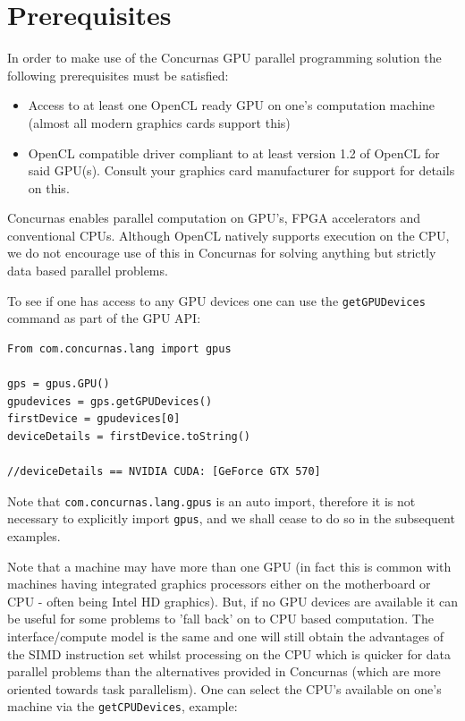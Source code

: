 \documentclass[conc-doc]{subfiles}
\begin{document}
\section{Prerequisites}
In order to make use of the Concurnas GPU parallel programming solution the following prerequisites must be satisfied:

\begin{itemize}
	\item Access to at least one OpenCL ready GPU on one's computation machine (almost all modern graphics cards support this)
	\item OpenCL compatible driver compliant to at least version 1.2 of OpenCL for said GPU(s). Consult your graphics card manufacturer for support for details on this.
\end{itemize}


Concurnas enables parallel computation on GPU's, FPGA accelerators and conventional CPUs. Although OpenCL natively supports execution on the CPU, we do not encourage use of this in Concurnas for solving anything but strictly data based parallel problems.

To see if one has access to any GPU devices one can use the \lstinline{getGPUDevices} command as part of the GPU API:

\begin{lstlisting}
From com.concurnas.lang import gpus

gps = gpus.GPU()
gpudevices = gps.getGPUDevices()
firstDevice = gpudevices[0]
deviceDetails = firstDevice.toString()

//deviceDetails == NVIDIA CUDA: [GeForce GTX 570]
\end{lstlisting}

Note that \lstinline{com.concurnas.lang.gpus} is an auto import, therefore it is not necessary to explicitly import \lstinline{gpus}, and we shall cease to do so in the subsequent examples.

Note that a machine may have more than one GPU (in fact this is common with machines having integrated graphics processors either on the motherboard or CPU - often being Intel HD graphics). But, if no GPU devices are available it can be useful for some problems to 'fall back' on to CPU based computation. The interface/compute model is the same and one will still obtain the advantages of the SIMD instruction set whilst processing on the CPU which is quicker for data parallel problems than the alternatives provided in Concurnas (which are more oriented towards task parallelism). One can select the CPU's available on one's machine via the \lstinline{getCPUDevices}, example:
\end{document}
